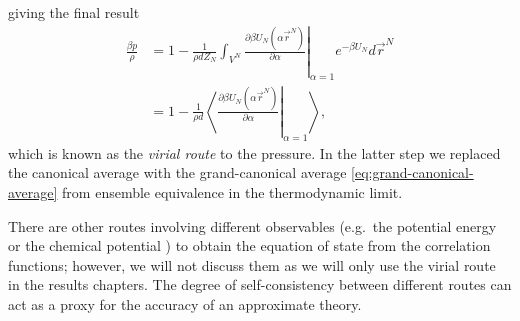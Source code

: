 giving the final result
\begin{equation}\label{eq:virial-route-pressure}
  \begin{split}
    \frac{\beta p}{\rho}
    &=
    1
    -
    \frac{1}{\rho d Z_N}
    \int_{V^N}
    \left.
    \frac{\partial \beta U_N(\alpha \vec{r}^N)}{\partial \alpha}
    \right|_{\alpha = 1}
    e^{-\beta U_N}
    d\vec{r}^N
    \\ &=
    1
    -
    \frac{1}{\rho d}
    \left\langle
    \left.
    \frac{\partial \beta U_N(\alpha \vec{r}^N)}{\partial \alpha}
    \right|_{\alpha = 1}
    \right\rangle,
  \end{split}
\end{equation}
which is known as the \emph{virial route}%
to the pressure.
In the latter step we replaced the canonical average with the grand-canonical average \eqref{eq:grand-canonical-average} from ensemble equivalence in the thermodynamic limit.

There are other routes involving different observables (e.g.\ the potential energy or the chemical potential \cite{Santos2016}) to obtain the equation of state from the correlation functions; however, we will not discuss them as we will only use the virial route in the results chapters.
The degree of self-consistency between different routes can act as a proxy for the accuracy of an approximate theory.

